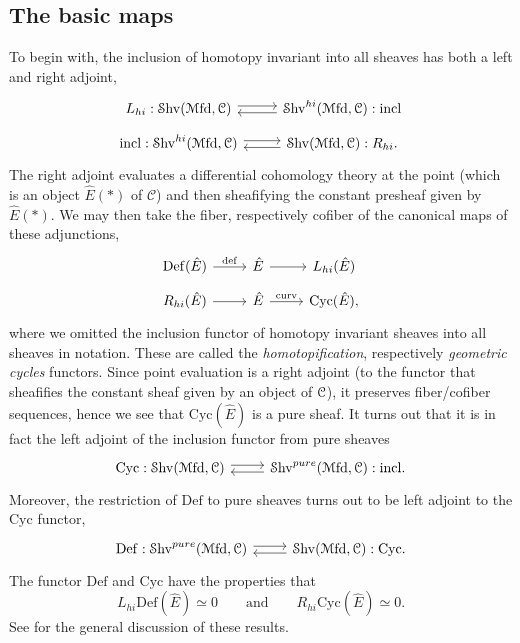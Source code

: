 \documentclass[10pt]{amsart}
\begin{document}
\subsection{The basic maps}
To begin with, the inclusion of homotopy invariant into all sheaves has both a left and right adjoint, 
\[
\begin{tikzcd}[row sep=0.2cm]
L_{hi} : \Shv(\Mfd, \lC)
\ar[r, shift left=1]
&
\Shv^{hi}(\Mfd, \lC)
\ar[l, shift left=1] : \mathrm{incl}
\\
\mathrm{incl} : \Shv^{hi}(\Mfd, \lC)
\ar[r, shift left=1]
&
\Shv(\Mfd, \lC)
\ar[l, shift left=1] : R_{hi}.
\end{tikzcd} 
\]
The right adjoint evaluates a differential cohomology theory at the point (which is an object $\hat{E}(*)$ of $\mathscr{C}$) and then sheafifying the constant presheaf given by $\hat{E}(*)$. We may then take the fiber, respectively cofiber of the canonical maps of these adjunctions,
\[
\begin{tikzcd}[row sep=0.2cm]
\mathrm{Def}(\hat{E}) \ar[r, "\mathrm{def}"] & \hat{E} \ar[r] & L_{hi}(\hat{E})
\\
R_{hi}(\hat{E}) \ar[r] & \hat{E} 
\ar[r, "\mathrm{curv}"] & \mathrm{Cyc}(\hat{E}),
\end{tikzcd}
\]
where we omitted the inclusion functor of homotopy invariant sheaves into all sheaves in notation. These are called the \emph{homotopification}, respectively \emph{geometric cycles} functors. Since point evaluation is a right adjoint (to the functor that sheafifies the constant sheaf given by an object of $\mathcal{C}$), it preserves fiber/cofiber sequences, hence we see that $\mathrm{Cyc}(\hat{E})$ is a pure sheaf. It turns out that it is in fact the left adjoint of the inclusion functor from pure sheaves
\[
\begin{tikzcd}[row sep=0.2cm]
\mathrm{Cyc} : \Shv(\Mfd, \lC)
\ar[r, shift left=1]
&
\Shv^{pure}(\Mfd, \lC)
\ar[l, shift left=1] : \mathrm{incl}.
\end{tikzcd} 
\]
Moreover, the restriction of $\mathrm{Def}$ to pure sheaves turns out to be left adjoint to the $\mathrm{Cyc}$ functor, 
\[
\begin{tikzcd}
\mathrm{Def} : \Shv^{pure}(\Mfd, \lC)
\ar[r, shift left=1]
&
\Shv(\Mfd, \lC)
\ar[l, shift left=1] : \mathrm{Cyc}.
\end{tikzcd} 
\]
The functor $\mathrm{Def}$ and $\mathrm{Cyc}$ have the properties that
\[
L_{hi}\mathrm{Def}(\hat{E}) \simeq 0 \qquad \text{and} \qquad R_{hi}\mathrm{Cyc}(\hat{E}) \simeq 0.
\]
See \cite[\S3]{bunkenikolausvoelkl2016diffcoh} for the general discussion of these results.
\end{document}
